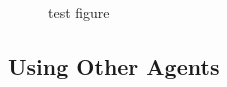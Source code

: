 \documentclass[12pt]{article}
\numberwithin{equation}{section}
\begin{document}
			\begin{figure}[h]
				\centering
				\captionsetup{justification=centering}
				\caption{test figure}
				\label{fig:test_figure}
			\end{figure}



		\subsection{Using Other Agents}		\label{sec:implementation.using_other_agents}
			
			\paragraph{}
\end{document}
